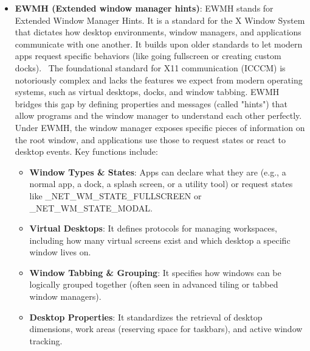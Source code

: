 \documentclass{report}
\begin{document}
\begin{itemize}
\begin{itemize}
\begin{itemize}
                        \item \textbf{Session Management}: Provides protocols for applications to interact with session managers, allowing users to safely save their workspace state, restart programs, or shut down without losing functionality.
                        \item \textbf{Shared Resources}: Details the conventions for sharing input focus and color maps, ensuring that apps don't compete or lock each other out of basic system resources.
                    \end{itemize}
                \item \textbf{EWMH (Extended window manager hints)}: EWMH stands for Extended Window Manager Hints. It is a standard for the X Window System that dictates how desktop environments, window managers, and applications communicate with one another. It builds upon older standards to let modern apps request specific behaviors (like going fullscreen or creating custom docks). 
                    \bigbreak \noindent 
                    The foundational standard for X11 communication (ICCCM) is notoriously complex and lacks the features we expect from modern operating systems, such as virtual desktops, docks, and window tabbing. EWMH bridges this gap by defining properties and messages (called "hints") that allow programs and the window manager to understand each other perfectly. 
                    \bigbreak \noindent 
                    Under EWMH, the window manager exposes specific pieces of information on the root window, and applications use those to request states or react to desktop events. Key functions include:
                    \begin{itemize}
                        \item \textbf{Window Types \& States}: Apps can declare what they are (e.g., a normal app, a dock, a splash screen, or a utility tool) or request states like \_NET\_WM\_STATE\_FULLSCREEN or \_NET\_WM\_STATE\_MODAL.
                        \item \textbf{Virtual Desktops}: It defines protocols for managing workspaces, including how many virtual screens exist and which desktop a specific window lives on.
                        \item \textbf{Window Tabbing \& Grouping}: It specifies how windows can be logically grouped together (often seen in advanced tiling or tabbed window managers).
                        \item \textbf{Desktop Properties}: It standardizes the retrieval of desktop dimensions, work areas (reserving space for taskbars), and active window tracking. 

\end{itemize}
\end{itemize}
\end{itemize}
\end{document}
